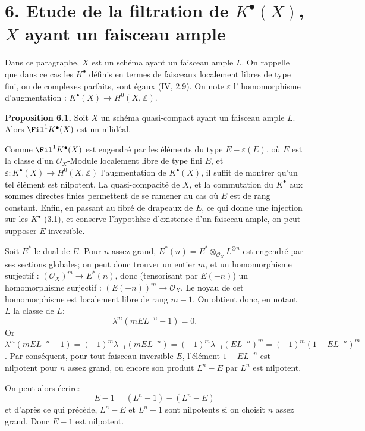 \section*{6. Etude de la filtration de \texorpdfstring{$K^{\bullet}(X)$}{K^{\bullet}(X)}, $X$ ayant un faisceau ample}

Dans ce paragraphe, $X$ est un schéma ayant un faisceau ample $L$. On rappelle que dans ce cas les $K^{\bullet}$ définis en termes de faisceaux localement libres de type fini, ou de complexes parfaits, sont égaux (IV, 2.9). On note $\varepsilon$ l'%
homomorphisme d'augmentation : $K^{\bullet}(X)\longrightarrow H^0(X,\mathbb Z)$.

\textbf{Proposition 6.1.} Soit $X$ un schéma quasi-compact ayant un faisceau ample $L$. Alors $\Fil^1K^{\bullet}(X)$ est un nilidéal.

Comme $\Fil^1K^{\bullet}(X)$ est engendré par les éléments du type $E-\varepsilon(E)$, où $E$ est la classe d'un $\mathcal O_X$-Module localement libre de type fini $E$, et $\varepsilon:K^{\bullet}(X)\to H^0(X,\mathbb Z)$ l'augmentation de $K^{\bullet}(X)$, il suffit de montrer qu'un tel élément est nilpotent. La quasi-compacité de $X$, et la commutation du $K^{\bullet}$ aux sommes directes finies permettent de se ramener au cas où $E$ est de rang constant. Enfin, en passant au fibré de drapeaux de $E$, ce qui donne une injection sur les $K^{\bullet}$ (3.1), et conserve l'hypothèse d'existence d'un faisceau ample, on peut supposer $E$ inversible.

Soit $E^*$ le dual de $E$. Pour $n$ assez grand, $E^*(n)=E^*\otimes_{\mathcal O_X}L^{\otimes n}$ est engendré par ses sections globales; on peut donc trouver un entier $m$, et un homomorphisme surjectif : $(\mathcal O_X)^m\longrightarrow E^*(n)$, donc (tensorisant par $E(-n)$) un homomorphisme surjectif : $(E(-n))^m\longrightarrow\mathcal O_X$. Le noyau de cet homomorphisme est localement libre de rang $m-1$. On obtient donc, en notant $L$ la classe de $L$:
\[
  \lambda^m(mEL^{-n}-1)=0 .
\]
Or $\lambda^m(mEL^{-n}-1)=(-1)^m\lambda_{-1}(mEL^{-n})=(-1)^m\lambda_{-1}(EL^{-n})^m=(-1)^m(1-EL^{-n})^m$. Par conséquent, pour tout faisceau inversible $E$, l'élément $1-EL^{-n}$ est nilpotent pour $n$ assez grand, ou encore son produit $L^n-E$ par $L^n$ est nilpotent.

On peut alors écrire:
\[
  E-1=(L^n-1)-(L^n-E)
\]
et d'après ce qui précède, $L^n-E$ et $L^n-1$ sont nilpotents si on choisit $n$ assez grand. Donc $E-1$ est nilpotent.


